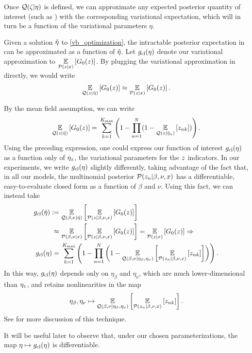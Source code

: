 Once $\mathcal{Q}(\zeta \vert \eta)$ is defined,
we can approximate any expected posterior quantity of interest
(such as ) with the
corresponding variational expectation, which will
in turn be a function of the variational parameters $\eta$.

\begin{ex}
%
Given a solution $\hat\eta$ to \eqref{vb_optimization}, the intractable posterior
expectation in  can be approximated as a
function of $\hat\eta$.  Let $g_{\text{cl}}(\eta)$ denote our variational
approximation to $\underset{\mathcal{P}(z\vert x)}{\mathbb{E}}\left[G_0(z)\right]$.  By plugging the
variational approximation in directly, we would write
%
\begin{align*}
%
\expect{\q(\z\vert\etaopt)}{\nclusters_0(\z)} \approx
    \expect{\p(\z\vert\x)}{\nclusters_0(\z)}.
%
\end{align*}

By the mean field assumption, we can write
%
\begin{align*}
%
\expect{\q(\z \vert \etaopt)}{\nclusters_0(\z)} ={}
    \sumk \left(1 -  \prod_{\n=1}^\N
        (1 - \expect{\q(\z \vert \etaoptz)}{\z_{\n\k}})\right).
%
\end{align*}
%
Using the preceding expression, one could express our function of interest
$g_{\text{cl}}(\eta)$ as a function only of $\eta_z$, the variational
parameters for the $z$ indicators.  In our experiments, we write
$g_{\text{cl}}(\eta)$ slightly differently, taking advantage of the fact that,
in all our models, the multinomial posterior $\mathcal{P}(z_n \vert \beta, \nu, x)$
has a differentiable, easy-to-evaluate closed form as a function of $\beta$ and
$\nu$. Using this fact, we can instead take
%
\begin{align*}
%
\gclustersabbr(\etaopt) :={}&
    \expect{\q(\beta, \nu \vert\etaopt)}{
        \expect{\p(\z \vert \beta, \nu, \x)}{\nclusters_0(\z)}
    }
\\\approx{}&
    \expect{\p(\beta, \nu \vert \x)}{
        \expect{\p(\z \vert \beta, \nu, \x)}{\nclusters_0(\z)}
    }
    = \expect{\p(\z\vert\x)}{\nclusters_0(\z)} \Rightarrow \\
%
\gclustersabbr(\eta) ={}&
    \sumk \left(1 -  \prod_{\n=1}^\N
        \left(1 - \expect{\q(\beta, \nu \vert \eta_\beta, \eta_\nu)}
                    {\expect{\p(\z_{\n} \vert \beta, \nu, \x)}{\z_{\n\k}}}
                    \right)\right).
%
\end{align*}
%
In this way, $g_{\text{cl}}(\eta)$ depends only on $\eta_\beta$ and $\eta_\nu$,
which are much lower-dimensional than $\eta_z$, and retains nonlinearities in
the map
%
\begin{align*}
%
\eta_\beta, \eta_\nu \mapsto \expect{\q(\beta, \nu \vert \eta_\beta,
\eta_\nu)} {\expect{\p(\z_{\n} \vert \beta, \nu, \x)}{\z_{\n\k}}}.
%
\end{align*}
%
See  for more discussion of this technique.

It will be useful later to observe that, under our chosen parameterizations, the
map $\eta \mapsto g_{\text{cl}}(\eta)$ is differentiable.
%
\end{ex}
